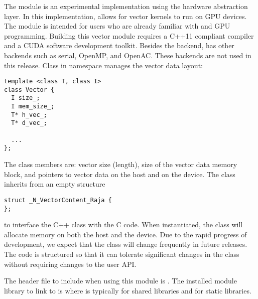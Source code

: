 %
The {\nvecraja} module is an experimental {\nvector} implementation using the
\href{https://software.llnl.gov/RAJA/}{\raja} hardware abstraction layer.
In this implementation, {\raja}
allows for {\sundials} vector kernels to run on GPU devices. The module is intended for users
who are already familiar with {\raja} and GPU programming. Building this vector
module requires a C++11 compliant compiler and a CUDA software development toolkit.
Besides the {\cuda} backend, {\raja} has other backends such as serial, OpenMP,
and OpenAC. These backends are not used in this {\sundials} release.
Class  in namespace  manages the vector data layout:
\begin{verbatim}
template <class T, class I>
class Vector {
  I size_;
  I mem_size_;
  T* h_vec_;
  T* d_vec_;

  ...
};
\end{verbatim}
The class members are: vector size (length), size of the vector data memory block,
and pointers to vector data on the host and on the device. The class 
inherits from an empty structure
\begin{verbatim}
struct _N_VectorContent_Raja {
};
\end{verbatim}
to interface the C++ class with the {\nvector} C code. When instantiated, the class
 will allocate memory on both the host and the device. Due to the rapid
progress of {\raja} development, we expect that the 
class will change frequently in future {\sundials} releases. The code is
structured so that it can tolerate significant changes in the
 class without requiring changes to the user API.


The header file to include when using this module is .
The installed module library to link to is
where  is typically  for shared libraries
and  for static libraries.


